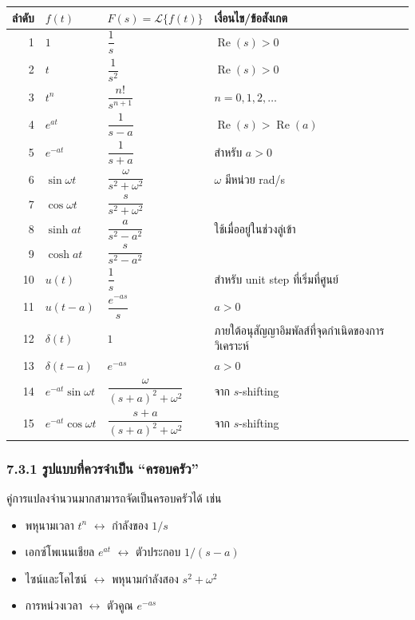 \begin{table}[htbp]
    \centering
    \begin{tabular}{r l l l}
        \hline
        \textbf{ลำดับ} & \textbf{$f(t)$} & \textbf{$F(s)=\mathcal{L}\{f(t)\}$} & \textbf{เงื่อนไข/ข้อสังเกต} \\
        \hline
        1 & $1$ & $\dfrac{1}{s}$ & $\operatorname{Re}(s)>0$ \\
        2 & $t$ & $\dfrac{1}{s^2}$ & $\operatorname{Re}(s)>0$ \\
        3 & $t^n$ & $\dfrac{n!}{s^{n+1}}$ & $n=0,1,2,\ldots$ \\
        4 & $e^{at}$ & $\dfrac{1}{s-a}$ & $\operatorname{Re}(s)>\operatorname{Re}(a)$ \\
        5 & $e^{-at}$ & $\dfrac{1}{s+a}$ & สำหรับ $a>0$ \\
        6 & $\sin \omega t$ & $\dfrac{\omega}{s^2+\omega^2}$ & $\omega$ มีหน่วย rad/s \\
        7 & $\cos \omega t$ & $\dfrac{s}{s^2+\omega^2}$ &  \\
        8 & $\sinh at$ & $\dfrac{a}{s^2-a^2}$ & ใช้เมื่ออยู่ในช่วงลู่เข้า \\
        9 & $\cosh at$ & $\dfrac{s}{s^2-a^2}$ &  \\
        10 & $u(t)$ & $\dfrac{1}{s}$ & สำหรับ unit step ที่เริ่มที่ศูนย์ \\
        11 & $u(t-a)$ & $\dfrac{e^{-as}}{s}$ & $a>0$ \\
        12 & $\delta(t)$ & $1$ & ภายใต้อนุสัญญาอิมพัลส์ที่จุดกำเนิดของการวิเคราะห์ \\
        13 & $\delta(t-a)$ & $e^{-as}$ & $a>0$ \\
        14 & $e^{-at}\sin \omega t$ & $\dfrac{\omega}{(s+a)^2+\omega^2}$ & จาก $s$-shifting \\
        15 & $e^{-at}\cos \omega t$ & $\dfrac{s+a}{(s+a)^2+\omega^2}$ & จาก $s$-shifting \\
        \hline
    \end{tabular}
\end{table}

\subsubsection{7.3.1 รูปแบบที่ควรจำเป็น “ครอบครัว”}

คู่การแปลงจำนวนมากสามารถจัดเป็นครอบครัวได้ เช่น

\begin{itemize}
    \item พหุนามเวลา $t^n$ $\leftrightarrow$ กำลังของ $1/s$
    \item เอกซ์โพเนนเชียล $e^{at}$ $\leftrightarrow$ ตัวประกอบ $1/(s-a)$
    \item ไซน์และโคไซน์ $\leftrightarrow$ พหุนามกำลังสอง $s^2+\omega^2$
    \item การหน่วงเวลา $\leftrightarrow$ ตัวคูณ $e^{-as}$
\end{itemize}

